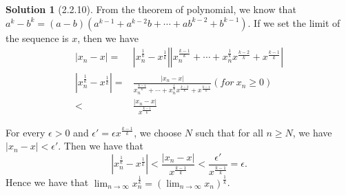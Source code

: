 \documentclass{article}
\theoremstyle{definition}
\newtheorem{sol}{Solution}[exe]
\begin{document}
\begin{sol}[2.2.10]
    From the theorem of polynomial, we know that $a^{k}-b^{k}=(a-b)(a^{k-1}+a^{k-2}b+\cdots+ab^{k-2}+b^{k-1})$. If we set the limit of the sequence is $x$, 
    then we have 
    \begin{align*}
        |x_{n}-x|=&|x_{n}^{\frac{1}{k}}-x^{\frac{1}{k}}||x_{n}^{\frac{k-1}{k}}+\cdots+x_{n}^{\frac{1}{k}}x^{\frac{k-2}{k}}+x^{\frac{k-1}{k}}|\\
        |x_{n}^{\frac{1}{k}}-x^{\frac{1}{k}}|=&\frac{|x_{n}-x|}{x_{n}^{\frac{k-1}{k}}+\cdots+x_{n}^{\frac{1}{k}}x^{\frac{k-2}{k}}+x^{\frac{k-1}{k}}}(for\ x_{n}\geq 0)\\
        <& \frac{|x_{n}-x|}{x^{\frac{k-1}{k}}}
    \end{align*}

    For every $\epsilon>0$ and $\epsilon '=\epsilon x^{\frac{k-1}{k}}$, we choose $N$ such that for all $n\geq N$, we have $|x_{n}-x|<\epsilon'$. Then we have that
    $$|x_{n}^{\frac{1}{k}}-x^{\frac{1}{k}}|<\frac{|x_{n}-x|}{x^{\frac{k-1}{k}}}<\frac{\epsilon'}{x^{\frac{k-1}{k}}}=\epsilon.$$
    Hence we have that $\lim_{n\to\infty}x_{n}^{\frac{1}{k}}=(\lim_{n\to\infty}x_{n})^{\frac{1}{k}}$.
\end{sol}
\end{document}
